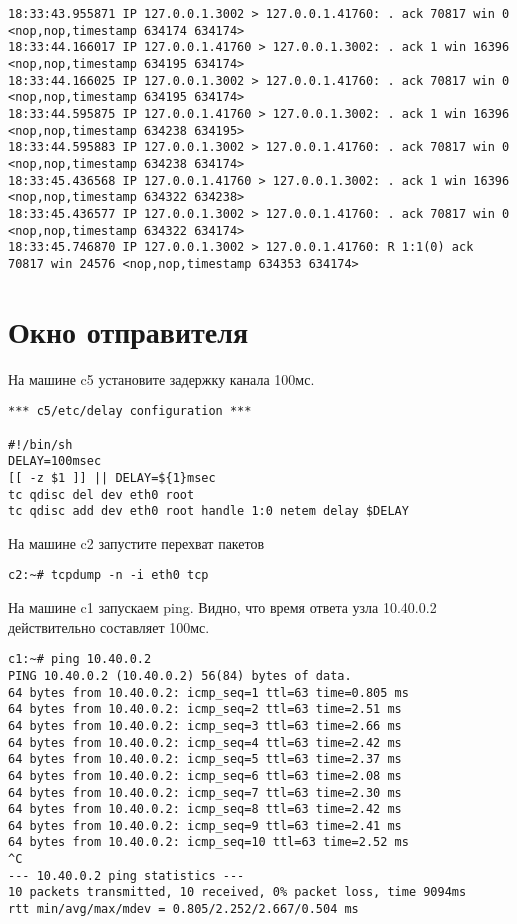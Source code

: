 \documentclass[a4paper,12pt]{article}
\begin{document}
\begin{lstlisting}
18:33:43.955871 IP 127.0.0.1.3002 > 127.0.0.1.41760: . ack 70817 win 0 <nop,nop,timestamp 634174 634174>
18:33:44.166017 IP 127.0.0.1.41760 > 127.0.0.1.3002: . ack 1 win 16396 <nop,nop,timestamp 634195 634174>
18:33:44.166025 IP 127.0.0.1.3002 > 127.0.0.1.41760: . ack 70817 win 0 <nop,nop,timestamp 634195 634174>
18:33:44.595875 IP 127.0.0.1.41760 > 127.0.0.1.3002: . ack 1 win 16396 <nop,nop,timestamp 634238 634195>
18:33:44.595883 IP 127.0.0.1.3002 > 127.0.0.1.41760: . ack 70817 win 0 <nop,nop,timestamp 634238 634174>
18:33:45.436568 IP 127.0.0.1.41760 > 127.0.0.1.3002: . ack 1 win 16396 <nop,nop,timestamp 634322 634238>
18:33:45.436577 IP 127.0.0.1.3002 > 127.0.0.1.41760: . ack 70817 win 0 <nop,nop,timestamp 634322 634174>
18:33:45.746870 IP 127.0.0.1.3002 > 127.0.0.1.41760: R 1:1(0) ack 70817 win 24576 <nop,nop,timestamp 634353 634174>
\end{lstlisting}

\section{Окно отправителя}

На машине c5 установите задержку канала 100мс.

\begin{lstlisting}
*** c5/etc/delay configuration ***

#!/bin/sh
DELAY=100msec
[[ -z $1 ]] || DELAY=${1}msec
tc qdisc del dev eth0 root
tc qdisc add dev eth0 root handle 1:0 netem delay $DELAY

\end{lstlisting}

На машине c2 запустите перехват пакетов
\begin{lstlisting}
c2:~# tcpdump -n -i eth0 tcp
\end{lstlisting}

На машине c1 запускаем ping. Видно, что время ответа узла 10.40.0.2 действительно составляет 100мс.
\begin{lstlisting}
c1:~# ping 10.40.0.2 
PING 10.40.0.2 (10.40.0.2) 56(84) bytes of data.
64 bytes from 10.40.0.2: icmp_seq=1 ttl=63 time=0.805 ms
64 bytes from 10.40.0.2: icmp_seq=2 ttl=63 time=2.51 ms
64 bytes from 10.40.0.2: icmp_seq=3 ttl=63 time=2.66 ms
64 bytes from 10.40.0.2: icmp_seq=4 ttl=63 time=2.42 ms
64 bytes from 10.40.0.2: icmp_seq=5 ttl=63 time=2.37 ms
64 bytes from 10.40.0.2: icmp_seq=6 ttl=63 time=2.08 ms
64 bytes from 10.40.0.2: icmp_seq=7 ttl=63 time=2.30 ms
64 bytes from 10.40.0.2: icmp_seq=8 ttl=63 time=2.42 ms
64 bytes from 10.40.0.2: icmp_seq=9 ttl=63 time=2.41 ms
64 bytes from 10.40.0.2: icmp_seq=10 ttl=63 time=2.52 ms
^C
--- 10.40.0.2 ping statistics ---
10 packets transmitted, 10 received, 0% packet loss, time 9094ms
rtt min/avg/max/mdev = 0.805/2.252/2.667/0.504 ms
\end{lstlisting}
\end{document}
